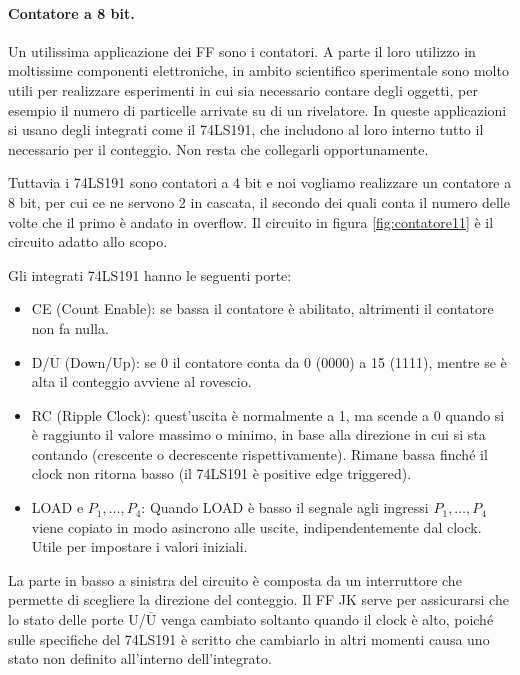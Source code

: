 \paragraph{Contatore a 8 bit.}

Un utilissima applicazione dei FF sono i contatori. A parte il loro utilizzo in moltissime componenti
elettroniche, in ambito scientifico sperimentale sono molto utili per realizzare esperimenti
in cui sia necessario contare degli oggetti, per esempio il numero di particelle arrivate su di un rivelatore.
In queste applicazioni si usano degli integrati come il 74LS191, che includono al loro interno tutto il necessario
per il conteggio. Non resta che collegarli opportunamente.

Tuttavia i 74LS191 sono contatori a 4 bit e noi vogliamo realizzare un contatore a 8 bit, per
cui ce ne servono 2 in cascata, il secondo dei quali conta il numero delle volte che il primo
è andato in overflow. Il circuito in figura \ref{fig:contatore11} è il circuito adatto allo scopo.

Gli integrati 74LS191 hanno le seguenti porte:

\begin{itemize}
    \item{CE (Count Enable): se bassa il contatore è abilitato, altrimenti il contatore non fa nulla.}
    \item{D/$\overline{\text{U}}$ (Down/Up): se 0 il contatore conta da 0 (0000) a 15 (1111), mentre se
        è alta il conteggio avviene al rovescio.}
    \item{RC (Ripple Clock): quest'uscita è normalmente a 1, ma scende a 0 quando si è raggiunto il valore massimo
        o minimo, in base alla direzione in cui si sta contando (crescente o decrescente rispettivamente).
        Rimane bassa finché il clock non ritorna basso (il 74LS191 è positive edge triggered).}
    \item{LOAD e $P_1,\dots,P_4$: Quando LOAD è basso il segnale agli ingressi $P_1,\dots,P_4$ viene copiato
        in modo asincrono alle uscite, indipendentemente dal clock. Utile per impostare i valori iniziali.}
\end{itemize}

La parte in basso a sinistra del circuito è composta da un interruttore che permette di scegliere la direzione
del conteggio. Il FF JK serve per assicurarsi che lo stato delle porte U/$\overline{\text{U}}$ venga cambiato
soltanto quando il clock è alto, poiché sulle specifiche del 74LS191 è scritto che cambiarlo in altri momenti
causa uno stato non definito all'interno dell'integrato. 

